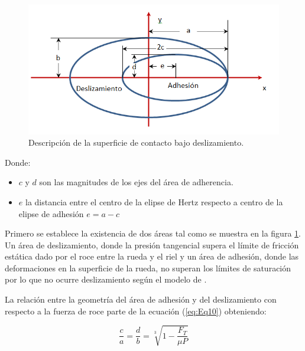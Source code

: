 \documentclass[main]{subfiles}
\begin{document}
\begin{figure}[!htbp]
\centering
    \includegraphics[scale=0.7]{Carter1.png}
  \caption{Descripción de la superficie de contacto bajo deslizamiento.}
  \label{fig:Carter1}
\end{figure}  
 
\bigskip  
  \par \hspace{2cm}
\begin{minipage}{8cm}
\begin{spacing}{0.5}
  Donde:
  \begin{itemize}
  \item $c$ y $d$ son las magnitudes de los ejes del área de adherencia.
 \item $e$ la distancia entre el centro de la elipse de Hertz respecto a centro de la elipse de
adhesión 
$ e=a-c$
  \end{itemize}
\end{spacing}
\end{minipage}
 
Primero se establece la existencia de dos áreas tal como se muestra en la figura \ref{fig:Carter1}. Un área de deslizamiento, donde la presión tangencial supera el límite de fricción estática dado por el roce entre la rueda y el riel y un área de adhesión, donde las deformaciones en la superficie de la rueda, no superan los límites de saturación por lo que no ocurre deslizamiento según el modelo de \citet{Carter1926}.

 
  La relación entre la geometría del área de adhesión y del deslizamiento con respecto a la fuerza de roce parte de la ecuación (\ref{eq:Eq10}) obteniendo:

 \begin{equation}
 \label{eq:Eq11}
 \frac{c}{a}=\frac{d}{b}=\sqrt[3]{1-\frac{F_T}{\mu P}}
 \end{equation}
  
\end{document}
